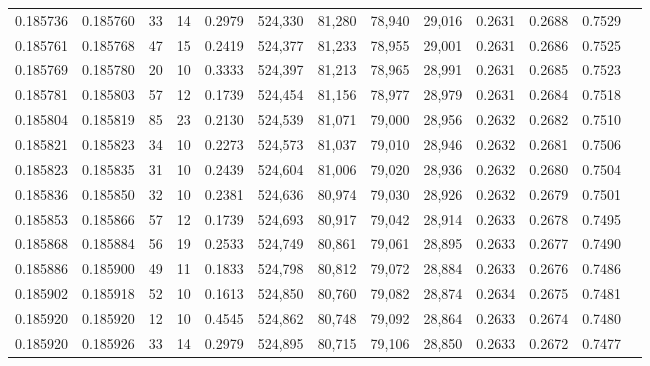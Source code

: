 \begin{tabular}{rrrrrrrrrrrrr}
0.185736 & 0.185760 &    33 &  14 &                                     0.2979 & 524,330 &  81,280 &  78,940 &  29,016 & 0.2631 & 0.2688 & 0.7529 \\
0.185761 & 0.185768 &    47 &  15 &                                     0.2419 & 524,377 &  81,233 &  78,955 &  29,001 & 0.2631 & 0.2686 & 0.7525 \\
0.185769 & 0.185780 &    20 &  10 &                                     0.3333 & 524,397 &  81,213 &  78,965 &  28,991 & 0.2631 & 0.2685 & 0.7523 \\
0.185781 & 0.185803 &    57 &  12 &                                     0.1739 & 524,454 &  81,156 &  78,977 &  28,979 & 0.2631 & 0.2684 & 0.7518 \\
0.185804 & 0.185819 &    85 &  23 &                                     0.2130 & 524,539 &  81,071 &  79,000 &  28,956 & 0.2632 & 0.2682 & 0.7510 \\
0.185821 & 0.185823 &    34 &  10 &                                     0.2273 & 524,573 &  81,037 &  79,010 &  28,946 & 0.2632 & 0.2681 & 0.7506 \\
0.185823 & 0.185835 &    31 &  10 &                                     0.2439 & 524,604 &  81,006 &  79,020 &  28,936 & 0.2632 & 0.2680 & 0.7504 \\
0.185836 & 0.185850 &    32 &  10 &                                     0.2381 & 524,636 &  80,974 &  79,030 &  28,926 & 0.2632 & 0.2679 & 0.7501 \\
0.185853 & 0.185866 &    57 &  12 &                                     0.1739 & 524,693 &  80,917 &  79,042 &  28,914 & 0.2633 & 0.2678 & 0.7495 \\
0.185868 & 0.185884 &    56 &  19 &                                     0.2533 & 524,749 &  80,861 &  79,061 &  28,895 & 0.2633 & 0.2677 & 0.7490 \\
0.185886 & 0.185900 &    49 &  11 &                                     0.1833 & 524,798 &  80,812 &  79,072 &  28,884 & 0.2633 & 0.2676 & 0.7486 \\
0.185902 & 0.185918 &    52 &  10 &                                     0.1613 & 524,850 &  80,760 &  79,082 &  28,874 & 0.2634 & 0.2675 & 0.7481 \\
0.185920 & 0.185920 &    12 &  10 &                                     0.4545 & 524,862 &  80,748 &  79,092 &  28,864 & 0.2633 & 0.2674 & 0.7480 \\
0.185920 & 0.185926 &    33 &  14 &                                     0.2979 & 524,895 &  80,715 &  79,106 &  28,850 & 0.2633 & 0.2672 & 0.7477 \\

\end{tabular}
